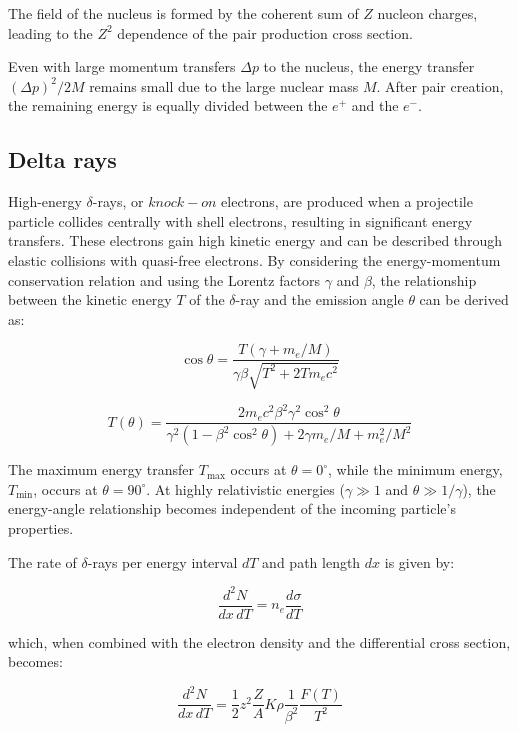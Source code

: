 The field of the nucleus is formed by the coherent sum of $Z$ 
nucleon charges, leading to the $Z^2$ dependence of the pair 
production cross section.

Even with large momentum transfers $\Delta p$ to the nucleus, 
the energy transfer $(\Delta p)^2/2M$ remains small due to the 
large nuclear mass $M$. After pair creation, the remaining 
energy is equally divided between the $e^+$ and the $e^-$.

\subsection{Delta rays}
High-energy $\delta$-rays, or $knock-on$ electrons, 
are produced when a projectile particle collides 
centrally with shell electrons, resulting in 
significant energy transfers. These electrons 
gain high kinetic energy and can be described 
through elastic collisions with quasi-free electrons. 
By considering the energy-momentum conservation relation 
and using the Lorentz factors $\gamma$ and $\beta$, the 
relationship between the kinetic energy $T$ of the 
$\delta$-ray and the emission angle $\theta$ can be derived as:

\begin{equation}
\cos \theta = \frac{T(\gamma + m_e / M)}{\gamma \beta \sqrt{T^2 + 2T m_e c^2}}
\end{equation}

\begin{equation}
T(\theta) = \frac{2 m_e c^2 \beta^2 \gamma^2 \cos^2 \theta}{\gamma^2(1 - \beta^2 \cos^2 \theta) + 2 \gamma m_e / M + m_e^2 / M^2}
\end{equation}

The maximum energy transfer $T_{\text{max}}$ occurs at $\theta = 0^\circ$, 
while the minimum energy, $T_{\text{min}}$, occurs at $\theta = 90^\circ$. 
At highly relativistic energies ($\gamma \gg 1$ and $\theta \gg 1/\gamma$), 
the energy-angle relationship becomes independent of the incoming particle's properties.

The rate of $\delta$-rays per energy interval $dT$ and path length $dx$ is given by:

\begin{equation}
\frac{d^2 N}{dx \, dT} = n_e \frac{d\sigma}{dT}
\end{equation}

which, when combined with the electron density and the differential cross section, becomes:

\begin{equation}
\frac{d^2 N}{dx \, dT} = \frac{1}{2} z^2 \frac{Z}{A} K \rho \frac{1}{\beta^2} \frac{F(T)}{T^2}
\end{equation}

